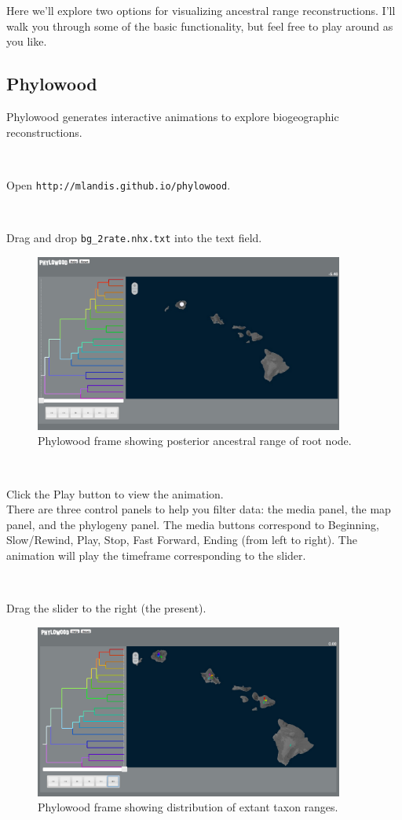 \documentclass[11pt]{article}
\newcommand{\impmark}{\strut\vadjust{\domark}}
\newcommand{\domark}{%
  \vbox to 0pt{
    \kern-\dp\strutbox
    \smash{\llap{$\rightarrow$\kern1em}}
    \vss
  }%
}
\begin{document}
Here we'll explore two options for visualizing ancestral range reconstructions.
I'll walk you through some of the basic functionality, but feel free to play around as you like.

\subsection{Phylowood}

Phylowood generates interactive animations to explore biogeographic reconstructions.

\noindent \\ \impmark Open \texttt{http://mlandis.github.io/phylowood}.

\noindent \\ \impmark Drag and drop \texttt{bg\_2rate.nhx.txt} into the text field.

\begin{figure}[H]
\centering
\includegraphics[width=4in]{figures/phw_mrca}
\caption{Phylowood frame showing posterior ancestral range of root node.}
\end{figure}

\noindent \\ \impmark Click the Play button to view the animation. \\

There are three control panels to help you filter data: the media panel, the map panel, and the phylogeny panel.
The media buttons correspond to Beginning, Slow/Rewind, Play, Stop, Fast Forward, Ending (from left to right).
The animation will play the timeframe corresponding to the slider.

\noindent \\ \impmark Drag the slider to the right (the present).

\begin{figure}[H]
\centering
\includegraphics[width=4in]{figures/phw_all}
\caption{Phylowood frame showing distribution of extant taxon ranges.}
\end{figure}
\end{document}
